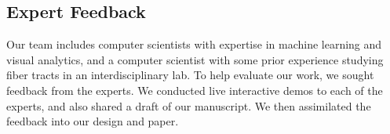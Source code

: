


\vspace*{-0.06in}
\subsection{Expert Feedback}

\noindent Our team includes computer scientists with expertise in machine learning and visual analytics, and a computer scientist with some prior experience studying fiber tracts in an interdisciplinary lab. To help evaluate our work, we sought feedback from the experts.%
We conducted live interactive demos to each of the experts, and also shared a draft of our manuscript. We then assimilated the feedback into our design and paper.

